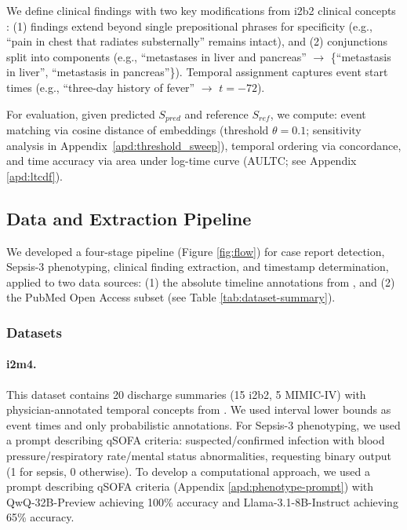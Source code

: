 \documentclass[pmlr,twocolumn,10pt]{jmlr} %
\begin{document}
We define clinical findings with two key modifications from i2b2 clinical concepts \citep{uzuner20112010}: (1) findings extend beyond single prepositional phrases for specificity (e.g., ``pain in chest that radiates substernally'' remains intact), and (2) conjunctions split into components (e.g., ``metastases in liver and pancreas'' $\rightarrow$ \{``metastasis in liver'', ``metastasis in pancreas''\}). Temporal assignment captures event start times (e.g., ``three-day history of fever'' $\rightarrow$ $t=-72$).

For evaluation, given predicted $S_{pred}$ and reference $S_{ref}$, we compute: event matching via cosine distance of embeddings (threshold $\theta=0.1$; sensitivity analysis in Appendix~\ref{apd:threshold_sweep}), temporal ordering via concordance, and time accuracy via area under log-time curve (AULTC; see Appendix \ref{apd:ltcdf}).

\subsection{Data and Extraction Pipeline}
We developed a four-stage pipeline (Figure \ref{fig:flow}) for case report detection, Sepsis-3 phenotyping, clinical finding extraction, and timestamp determination, applied to two data sources: (1) the absolute timeline annotations from \cite{frattallone2024using}, and (2) the PubMed Open Access subset \citep{pmc2024open} (see Table \ref{tab:dataset-summary}).



\subsubsection{Datasets}
\label{section:datasets}

\paragraph{i2m4.} This dataset contains 20 discharge summaries (15 i2b2, 5 MIMIC-IV) with physician-annotated temporal concepts from \cite{frattallone2024using}. We used interval lower bounds as event times and only probabilistic annotations. For Sepsis-3 phenotyping, we used a prompt describing qSOFA criteria: suspected/confirmed infection with blood pressure/respiratory rate/mental status abnormalities, requesting binary output (1 for sepsis, 0 otherwise).
To develop a computational approach, we used a prompt describing qSOFA criteria (Appendix \ref{apd:phenotype-prompt}) with QwQ-32B-Preview achieving 100\% accuracy and Llama-3.1-8B-Instruct achieving 65\% accuracy.
\end{document}
